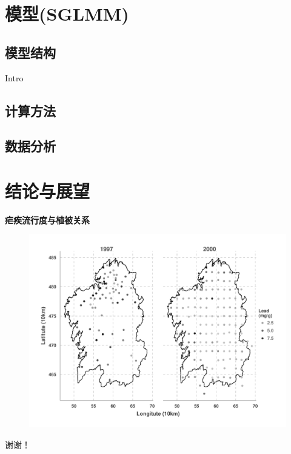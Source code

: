 \documentclass[11pt,compress,xcolor=x11names,UTF8]{ctexbeamer}
\begin{document}
\section{模型(SGLMM)}

\subsection{模型结构}

\begin{frame}{Intro}

\end{frame}

\subsection{计算方法}

\subsection{数据分析}

\section{结论与展望}



\begin{frame}
\textbf{疟疾流行度与植被关系}
\begin{figure}
\centering
\includegraphics[width=.75\textwidth]{demo03}
\end{figure}
\end{frame}





\begin{frame}

  \centerline{\Huge\color{red} 谢谢！ }

\end{frame}
\end{document}
